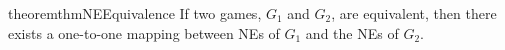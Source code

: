 \begin{restatable}{theorem}{thmNEEquivalence}
\label{thm:NE:unique:equivalence}
If two games, $G_1$ and $G_2$, are equivalent, then there exists a one-to-one mapping between NEs of $G_1$ and the NEs of $G_2$.
\end{restatable}